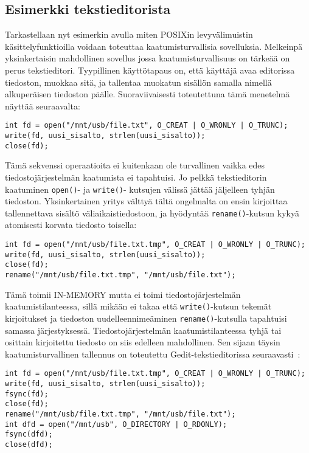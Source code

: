 \subsection{Esimerkki tekstieditorista}
Tarkastellaan nyt esimerkin avulla miten POSIXin levyvälimuistin käsittelyfunktioilla voidaan toteuttaa kaatumisturvallisia sovelluksia.
Melkeinpä yksinkertaisin mahdollinen sovellus jossa kaatumisturvallisuus on tärkeää on perus tekstieditori.
Tyypillinen käyttötapaus on, että käyttäjä avaa editorissa tiedoston, muokkaa sitä, ja tallentaa muokatun sisällön samalla nimellä alkuperäisen tiedoston päälle.
Suoraviivaisesti toteutettuna tämä menetelmä näyttää seuraavalta:

\begin{verbatim}
int fd = open("/mnt/usb/file.txt", O_CREAT | O_WRONLY | O_TRUNC);
write(fd, uusi_sisalto, strlen(uusi_sisalto));
close(fd);
\end{verbatim}

Tämä sekvenssi operaatioita ei kuitenkaan ole turvallinen vaikka edes tiedostojärjestelmän kaatumista ei tapahtuisi.
Jo pelkkä tekstieditorin kaatuminen \texttt{open()}- ja \texttt{write()}- kutsujen välissä jättää jäljelleen tyhjän tiedoston.
Yksinkertainen yritys välttyä tältä ongelmalta on ensin kirjoittaa tallennettava sisältö väliaikaistiedostoon,
ja hyödyntää \texttt{rename()}-kutsun kykyä atomisesti korvata tiedosto toisella:

\begin{verbatim}
int fd = open("/mnt/usb/file.txt.tmp", O_CREAT | O_WRONLY | O_TRUNC);
write(fd, uusi_sisalto, strlen(uusi_sisalto));
close(fd);
rename("/mnt/usb/file.txt.tmp", "/mnt/usb/file.txt");
\end{verbatim}

Tämä toimii IN-MEMORY mutta ei toimi tiedostojärjestelmän kaatumistilanteessa,
sillä mikään ei takaa että \texttt{write()}-kutsun tekemät kirjoitukset ja tiedoston uudelleennimeäminen \texttt{rename()}-kutsulla tapahtuisi samassa järjestyksessä.
Tiedostojärjestelmän kaatumistilanteessa tyhjä tai osittain kirjoitettu tiedosto on siis edelleen mahdollinen.
Sen sijaan täysin kaatumisturvallinen tallennus on toteutettu Gedit-tekstieditorissa seuraavasti~\cite{OptimisticCrashConsistency}:

\begin{verbatim}
int fd = open("/mnt/usb/file.txt.tmp", O_CREAT | O_WRONLY | O_TRUNC);
write(fd, uusi_sisalto, strlen(uusi_sisalto));
fsync(fd);
close(fd);
rename("/mnt/usb/file.txt.tmp", "/mnt/usb/file.txt");
int dfd = open("/mnt/usb", O_DIRECTORY | O_RDONLY);
fsync(dfd);
close(dfd);
\end{verbatim}

